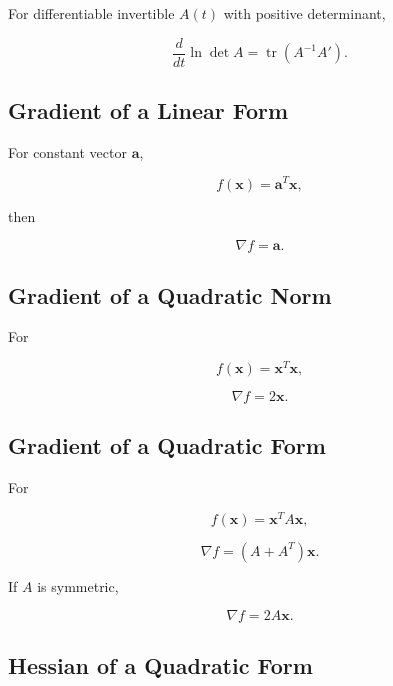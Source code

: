 For differentiable invertible \(A(t)\) with positive determinant,

\[
\boxed{
\frac{d}{dt}
\ln\det A
=
\operatorname{tr}
\left(
A^{-1}A'
\right).
}
\]

\subsection{Gradient of a Linear Form}
\label{subsec:gradient-linear-form}

For constant vector \(\mathbf{a}\),

\[
f(\mathbf{x})
=
\mathbf{a}^T\mathbf{x},
\]

then

\[
\boxed{
\nabla f
=
\mathbf{a}.
}
\]

\subsection{Gradient of a Quadratic Norm}
\label{subsec:gradient-norm-squared}

For

\[
f(\mathbf{x})
=
\mathbf{x}^T\mathbf{x},
\]

\[
\boxed{
\nabla f
=
2\mathbf{x}.
}
\]

\subsection{Gradient of a Quadratic Form}
\label{subsec:gradient-quadratic-form}

For

\[
f(\mathbf{x})
=
\mathbf{x}^TA\mathbf{x},
\]

\[
\boxed{
\nabla f
=
(A+A^T)\mathbf{x}.
}
\]

If \(A\) is symmetric,

\[
\boxed{
\nabla f
=
2A\mathbf{x}.
}
\]

\subsection{Hessian of a Quadratic Form}
\label{subsec:hessian-quadratic-form}

